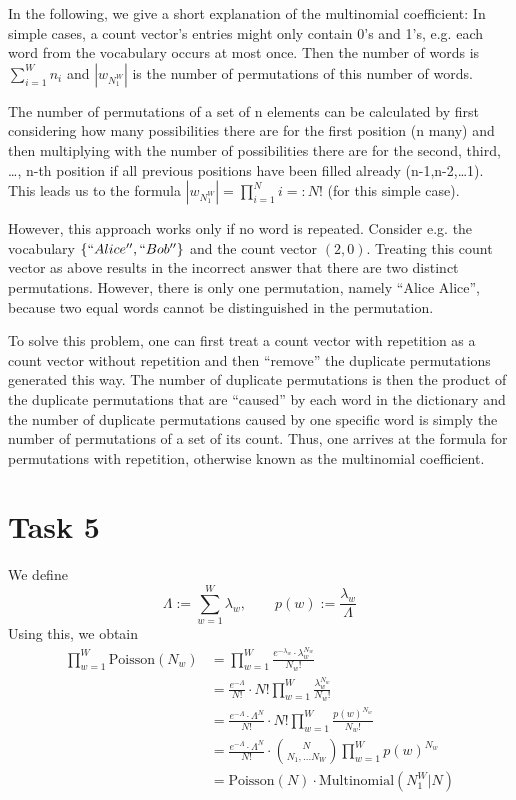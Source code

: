 \documentclass[%
   11pt,              %
   ngerman,           %
   a4paper,           %
   DIV11,             %
]{scrartcl}%
\begin{document}
In the following, we give a short explanation of the multinomial coefficient:
In simple cases, a count vector's entries might only contain 0's and 1's, e.g. each word from the vocabulary occurs at most once. Then the number of words is $\displaystyle\sum_{i=1}^W n_i$ and $|w_{N_1^W}|$ is the number of permutations of this number of words. 

The number of permutations of a set of n elements can be calculated by first considering how many possibilities there are for the first position (n many) and then multiplying with the number of possibilities there are for the second, third, \ldots, n-th position if all previous positions have been filled already (n-1,n-2,\ldots 1). This leads us to the formula $|w_{N_1^W}|= \displaystyle\prod_{i=1}^N i =: N!$ (for this simple case).

However, this approach works only if no word is repeated. Consider e.g. the vocabulary $\{``Alice'',``Bob''\}$ and the count vector $(2,0)$. Treating this count vector as above results in the incorrect answer that there are two distinct permutations. However, there is only one permutation, namely ``Alice Alice'', because two equal words cannot be distinguished in the permutation.

To solve this problem, one can first treat a count vector with repetition as a count vector without repetition and then ``remove'' the duplicate permutations generated this way. The number of duplicate permutations is then the product of the duplicate permutations that are ``caused'' by each word in the dictionary and the number of duplicate permutations caused by one specific word is simply the number of permutations of a set of its count. Thus, one arrives at the formula for permutations with repetition, otherwise known as the multinomial coefficient.


\section*{Task 5}
We define
\begin{equation*}
	\Lambda := \sum_{w=1}^W \lambda_w, \qquad p(w) := \frac{\lambda_w}{\Lambda}
\end{equation*}
Using this, we obtain
\begin{align*}
\prod_{w=1}^W \text{Poisson}(N_w) &= \prod_{w=1}^W \frac{e^{-\lambda_w} \cdot \lambda_w^{N_w}}{N_w !} \\
&= \frac{e^{-\Lambda}}{N!} \cdot N! \prod_{w=1}^W \frac{\lambda_w^{N_w}}{N_w !} \\
&= \frac{e^{-\Lambda} \cdot \Lambda^N}{N!} \cdot N! \prod_{w=1}^W \frac{p(w)^{N_w}}{N_w !} \\
&= \frac{e^{-\Lambda} \cdot \Lambda^N}{N!} \cdot {N \choose N_1,\ldots N_W} \prod_{w=1}^W p(w)^{N_w} \\
&= \text{Poisson}(N) \cdot \text{Multinomial}(N_1^W|N)
\end{align*}
\end{document}
